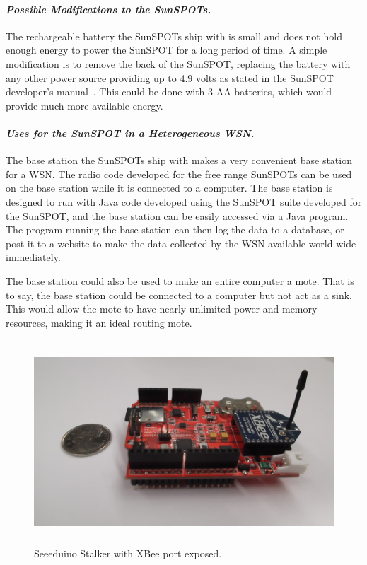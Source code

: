 \paragraph{\emph{Possible Modifications to the SunSPOTs.}}
	The rechargeable battery the SunSPOTs ship with is small and does not hold 
	enough energy to power the SunSPOT for a long period of time. A simple modification is
	to remove the back of the SunSPOT, replacing the battery with any other power source providing 
	up to 4.9 volts as stated in the SunSPOT developer's manual~\cite{sunspotmanual}. 
	This could be done with 3 AA batteries, which would provide much more available energy.
	
\paragraph{\emph{Uses for the SunSPOT in a Heterogeneous WSN.}}
	The base station the SunSPOTs ship with makes a very convenient base station for a 
	WSN. The radio code developed for the free range SunSPOTs can be used on the base station
	while it is connected to a computer. The base station is designed to run with
	Java code developed using the SunSPOT suite developed for the SunSPOT, and
	the base station can be easily accessed via a Java program. The program running the 
	base station can then log the data to a database, or post it to a website to make the 
	data collected by the WSN available world-wide immediately.
	
	The base station could also be used to make an entire computer a mote.
	That is to say, the base station could be connected to a computer but not act 
	as a sink. This would allow the mote to have nearly unlimited power and memory resources, 
	making it an ideal routing mote.

	\begin{figure}[tbh]
		\centering
			\includegraphics[height=3in]{images/motes/stalkerXbee1.jpg}
		\caption{Seeeduino Stalker with XBee port exposed.}
		\label{fig:images_motes_stalkerXbee1}
	\end{figure}

